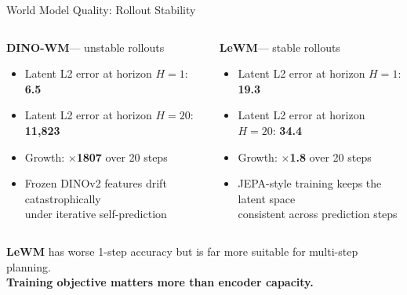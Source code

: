 \documentclass[aspectratio=169, 11pt]{beamer}
\newcommand{\lewm}{\textcolor{LeWMc}{\textbf{LeWM}}\xspace}
\newcommand{\dino}{\textcolor{DINOc}{\textbf{DINO-WM}}\xspace}
\begin{document}
\begin{frame}{World Model Quality: Rollout Stability}

  \begin{columns}[T]

    \begin{alertblock}{\dino — unstable rollouts}
      \begin{itemize}
        \item Latent L2 error at horizon $H{=}1$: \textbf{6.5}
        \item Latent L2 error at horizon $H{=}20$: \textbf{11{,}823}
        \item Growth: $\times$\textbf{1807} over 20 steps
        \item Frozen DINOv2 features drift catastrophically\\
              under iterative self-prediction
      \end{itemize}
    \end{alertblock}

    \begin{exampleblock}{\lewm — stable rollouts}
      \begin{itemize}
        \item Latent L2 error at horizon $H{=}1$: \textbf{19.3}
        \item Latent L2 error at horizon $H{=}20$: \textbf{34.4}
        \item Growth: $\times$\textbf{1.8} over 20 steps
        \item JEPA-style training keeps the latent space\\
              consistent across prediction steps
      \end{itemize}
    \end{exampleblock}

  \end{columns}

  \vspace{0.9em}
  \begin{center}
    \lewm has worse 1-step accuracy but is far more suitable for multi-step planning.\\
    \textbf{Training objective matters more than encoder capacity.}
  \end{center}

\end{frame}
\end{document}
